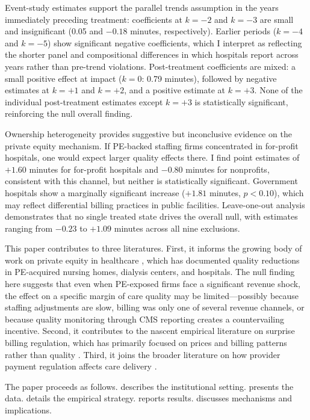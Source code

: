 \documentclass[12pt]{article}
\begin{document}
Event-study estimates support the parallel trends assumption in the years immediately preceding treatment: coefficients at $k = -2$ and $k = -3$ are small and insignificant (0.05 and $-0.18$ minutes, respectively). Earlier periods ($k = -4$ and $k = -5$) show significant negative coefficients, which I interpret as reflecting the shorter panel and compositional differences in which hospitals report across years rather than pre-trend violations. Post-treatment coefficients are mixed: a small positive effect at impact ($k = 0$: 0.79 minutes), followed by negative estimates at $k = +1$ and $k = +2$, and a positive estimate at $k = +3$. None of the individual post-treatment estimates except $k = +3$ is statistically significant, reinforcing the null overall finding.

Ownership heterogeneity provides suggestive but inconclusive evidence on the private equity mechanism. If PE-backed staffing firms concentrated in for-profit hospitals, one would expect larger quality effects there. I find point estimates of $+1.60$ minutes for for-profit hospitals and $-0.80$ minutes for nonprofits, consistent with this channel, but neither is statistically significant. Government hospitals show a marginally significant increase ($+1.81$ minutes, $p < 0.10$), which may reflect differential billing practices in public facilities. Leave-one-out analysis demonstrates that no single treated state drives the overall null, with estimates ranging from $-0.23$ to $+1.09$ minutes across all nine exclusions.

This paper contributes to three literatures. First, it informs the growing body of work on private equity in healthcare \citep{eliason2020, gupta2021, laPointe2023}, which has documented quality reductions in PE-acquired nursing homes, dialysis centers, and hospitals. The null finding here suggests that even when PE-exposed firms face a significant revenue shock, the effect on a specific margin of care quality may be limited---possibly because staffing adjustments are slow, billing was only one of several revenue channels, or because quality monitoring through CMS reporting creates a countervailing incentive. Second, it contributes to the nascent empirical literature on surprise billing regulation, which has primarily focused on prices and billing patterns rather than quality \citep{adler2023, christensen2023}. Third, it joins the broader literature on how provider payment regulation affects care delivery \citep{clemens2014, garthwaite2012, ho2019}.

The paper proceeds as follows.  describes the institutional setting.  presents the data.  details the empirical strategy.  reports results.  discusses mechanisms and implications.
\end{document}
